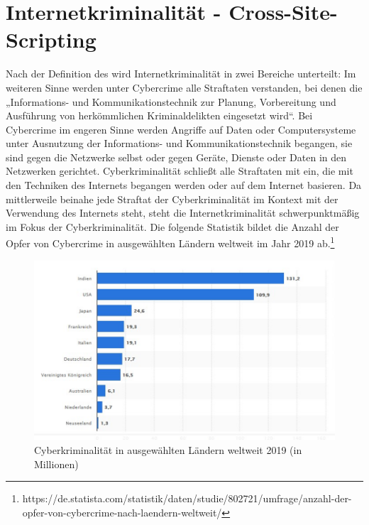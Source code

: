 \section{Internetkriminalität - Cross-Site-Scripting}
\label{section:cyber_criminality-Cross-Site-Scripting}

Nach der Definition des \textcite[16]{bundeskriminalamt2020} wird Internetkriminalität in zwei Bereiche unterteilt: Im weiteren Sinne werden unter Cybercrime alle Straftaten verstanden, bei denen die „Informations- und Kommunikationstechnik zur Planung, Vorbereitung und Ausführung von herkömmlichen Kriminaldelikten eingesetzt wird“. Bei Cybercrime im engeren Sinne werden Angriffe auf Daten oder Computersysteme unter Ausnutzung der Informations- und Kommunikationstechnik begangen, sie sind gegen die Netzwerke selbst oder gegen Geräte, Dienste oder Daten in den Netzwerken gerichtet. Cyberkriminalität schließt alle Straftaten mit ein, die mit den Techniken des Internets begangen werden oder auf dem Internet basieren. Da mittlerweile beinahe jede Straftat der Cyberkriminalität im Kontext mit der Verwendung des Internets steht, steht die Internetkriminalität schwerpunktmäßig im Fokus der Cyberkriminalität. Die folgende Statistik bildet die Anzahl der Opfer von Cybercrime in ausgewählten Ländern weltweit im Jahr 2019 ab.\footnote{https://de.statista.com/statistik/daten/studie/802721/umfrage/anzahl-der-opfer-von-cybercrime-nach-laendern-weltweit/}

\begin{figure}[ht]
	\centering
	\includegraphics[width=1\linewidth]{images/cybercrime_world_2019.png}
	\caption[Cyberkriminalität in ausgewählten Ländern weltweit 2019]
	{Cyberkriminalität in ausgewählten Ländern weltweit 2019 (in Millionen)}
\end{figure}

